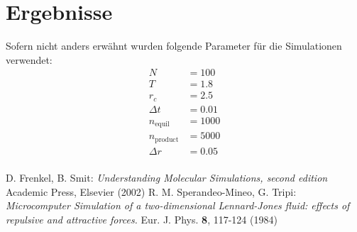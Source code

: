 \documentclass[11pt,a4paper]{article}
\newcommand{\ind}[1]{_{\mathrm{#1}}}
\begin{document}
\section{Ergebnisse} %
\label{sec:ergebnisse}
Sofern nicht anders erwähnt wurden folgende Parameter für die Simulationen verwendet:
\begin{align*}
	N &= 100\\
	T &= 1.8\\
	r_c &= 2.5\\
	\Delta t &= 0.01\\
	n\ind{equil} &= 1000\\
	n\ind{product} &= 5000\\
	\Delta r &= 0.05\\
\end{align*}



%  
% 
\begin{thebibliography}{xx}
	 D. Frenkel, B. Smit: \emph{Understanding Molecular Simulations, second edition} Academic Press, Elsevier (2002)
	 R. M. Sperandeo-Mineo, G. Tripi: \emph{Microcomputer Simulation of a two-dimensional Lennard-Jones fluid: effects of repulsive and attractive forces.} Eur. J. Phys. \textbf{8}, 117-124 (1984)
\end{thebibliography}
\end{document}
